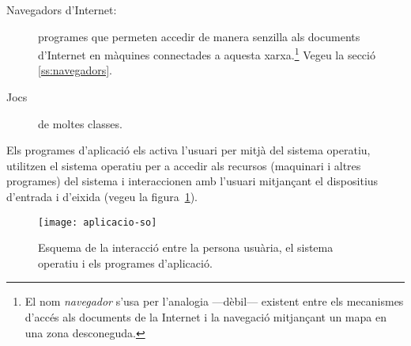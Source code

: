 \begin{description}
\begin{description}
\begin{description}
    \item[Navegadors d'Internet:] programes que permeten
      accedir de manera senzilla als documents d'Internet
      en màquines connectades a aquesta xarxa.\footnote{El
        nom \emph{navegador} s'usa per l'analogia
        ---dèbil--- existent entre els mecanismes d'accés
        als documents de la Internet i la navegació
        mitjançant un mapa en una zona desconeguda.}
      Vegeu la secció \ref{ss:navegadors}.
    \item[Jocs] de moltes classes.
    \end{description}
  \end{description}
  Els programes d'aplicació els activa l'usuari per mitjà del
  sistema operatiu, utilitzen el sistema operatiu per a accedir
  als recursos (maquinari i altres programes) del sistema i
  interaccionen amb l'usuari mitjançant el dispositius d'entrada
  i d'eixida (vegeu la figura~\ref{fg:aplicacio-so}).
\end{description}

\begin{figure}
  \centering
  \texttt{[image: aplicacio-so]}
  \caption{Esquema de la interacció entre la persona usuària, el
    sistema operatiu i els programes d'aplicació.}
  \label{fg:aplicacio-so}
\end{figure}

